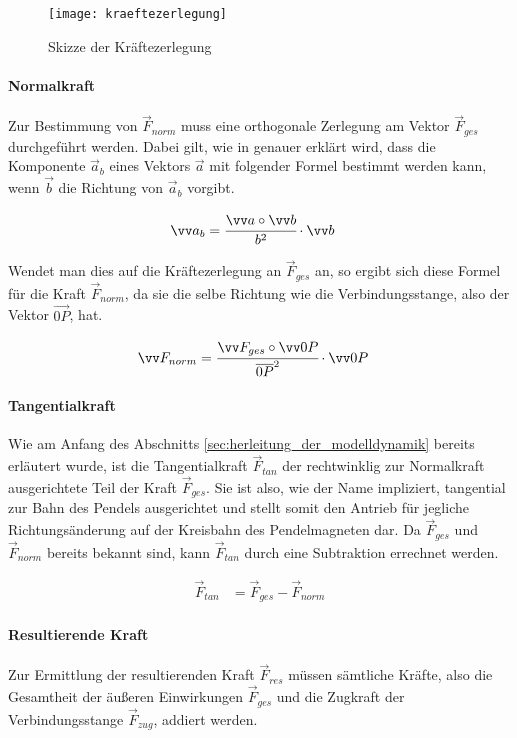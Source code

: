 \begin{figure}
    \texttt{[image: kraeftezerlegung]}
    \caption{Skizze der Kräftezerlegung}
    \label{fig:skizze_der_kräftezerlegung}
\end{figure}

\paragraph{Normalkraft} Zur Bestimmung von $\vec{F}_{norm}$ muss eine orthogonale Zerlegung am Vektor $\vec{F}_{ges}$ durchgeführt werden. Dabei gilt, wie in \cite{meyberg2013hoehere} genauer erklärt wird, dass die Komponente $\vec{a}_{b}$ eines Vektors $\vec{a}$ mit folgender Formel bestimmt werden kann, wenn $\vec{b}$ die Richtung von $\vec{a}_{b}$ vorgibt.

\begin{align*}
    \vec{a}_{b} &= \cfrac{\vec{a} \circ \vec{b}}{b^2} \cdot \vec{b}
\end{align*}

Wendet man dies auf die Kräftezerlegung an $\vec{F}_{ges}$ an, so ergibt sich diese Formel für die Kraft $\vec{F}_{norm}$, da sie die selbe Richtung wie die Verbindungsstange, also der Vektor $\vec{0P}$, hat.

\begin{align} \label{f_norm}
    \vec{F}_{norm} &= \cfrac{\vec{F}_{ges} \circ \vec{0P}}{\overline{0P}^2} \cdot \vec{0P}
\end{align}

\paragraph{Tangentialkraft} Wie am Anfang des Abschnitts \ref{sec:herleitung_der_modelldynamik} bereits erläutert wurde, ist die Tangentialkraft $\vec{F}_{tan}$ der rechtwinklig zur Normalkraft ausgerichtete Teil der Kraft $\vec{F}_{ges}$. Sie ist also, wie der Name impliziert, tangential zur Bahn des Pendels ausgerichtet und stellt somit den Antrieb für jegliche Richtungsänderung auf der Kreisbahn des Pendelmagneten dar. Da $\vec{F}_{ges}$ und $\vec{F}_{norm}$ bereits bekannt sind, kann $\vec{F}_{tan}$ durch eine Subtraktion errechnet werden.

\begin{align} \label{f_tan}
    \vec{F}_{tan} &= \vec{F}_{ges} - \vec{F}_{norm}
\end{align}

\paragraph{Resultierende Kraft} Zur Ermittlung der resultierenden Kraft $\vec{F}_{res}$ müssen sämtliche Kräfte, also die Gesamtheit der äußeren Einwirkungen $\vec{F}_{ges}$ und die Zugkraft der Verbindungsstange $\vec{F}_{zug}$, addiert werden.

